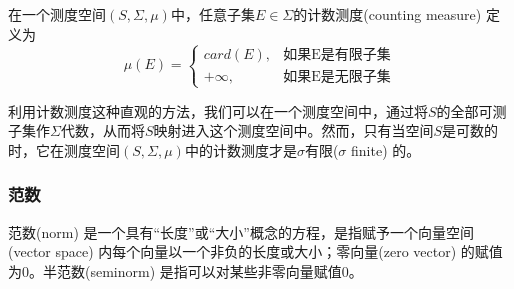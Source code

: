 \begin{definition}[计数测度]
  \label{definition:measure-counting-measure}
  在一个测度空间$(S,\Sigma,\mu)$中，任意子集$E \in \Sigma$的计数测度(counting measure) 定义为
  \begin{equation*}
    \mu(E) = \begin{cases}
    card(E), &\text{如果E是有限子集} \\
    +\infty, &\text{如果E是无限子集}
    \end{cases}
  \end{equation*}

  利用计数测度这种直观的方法，我们可以在一个测度空间中，通过将$S$的全部可测子集作$\Sigma$代数，从而将$S$映射进入这个测度空间中。然而，只有当空间$S$是可数的时，它在测度空间$(S,\Sigma,\mu)$中的计数测度才是$\sigma$有限($\sigma$ finite) 的。
  \end{definition}

  \subsubsection{范数}
  \label{sec:lp-norm}
  范数(norm) 是一个具有``长度''或``大小''概念的方程，是指赋予一个向量空间(vector space) 内每个向量以一个非负的长度或大小；零向量(zero vector) 的赋值为0。半范数(seminorm) 是指可以对某些非零向量赋值0。

